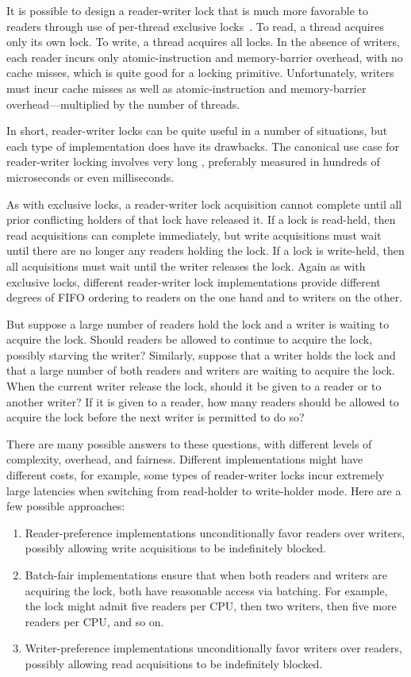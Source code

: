 It is possible to design a reader-writer lock that is much more
favorable to readers through use of per-thread exclusive
locks~\cite{WilsonCHsieh92a}.
To read, a thread acquires only its own lock.
To write, a thread acquires all locks.
In the absence of writers, each reader incurs only atomic-instruction
and memory-barrier overhead, with no cache misses, which is quite
good for a locking primitive.
Unfortunately, writers must incur cache misses as well as atomic-instruction
and memory-barrier overhead---multiplied by the number of threads.

In short, reader-writer locks can be quite useful in a number of
situations, but each type of implementation does have its drawbacks.
The canonical use case for reader-writer locking involves very long
, preferably measured in hundreds of microseconds
or even milliseconds.

As with exclusive locks, a reader-writer lock acquisition cannot complete
until all prior conflicting holders of that lock have released it.
If a lock is read-held, then read acquisitions can complete immediately,
but write acquisitions must wait until there are no longer any readers
holding the lock.
If a lock is write-held, then all acquisitions must wait until the writer
releases the lock.
Again as with exclusive locks, different reader-writer lock implementations
provide different degrees of FIFO ordering to readers on the one hand
and to writers on the other.

But suppose a large number of readers hold the lock and a writer is waiting
to acquire the lock.
Should readers be allowed to continue to acquire the lock, possibly
starving the writer?
Similarly, suppose that a writer holds the lock and that a large number
of both readers and writers are waiting to acquire the lock.
When the current writer release the lock, should it be given to a reader
or to another writer?
If it is given to a reader, how many readers should be allowed to acquire
the lock before the next writer is permitted to do so?

There are many possible answers to these questions, with different
levels of complexity, overhead, and fairness.
Different implementations might have different costs, for example,
some types of reader-writer locks incur extremely large latencies
when switching from read-holder to write-holder mode.
Here are a few possible approaches:

\begin{enumerate}
\item	
	Reader-preference implementations unconditionally favor readers
	over writers, possibly allowing write acquisitions to be
	indefinitely blocked.
\item	Batch-fair implementations ensure that when both readers and writers
	are acquiring the lock, both have reasonable access via batching.
	For example, the lock might admit five readers per CPU, then two
	writers, then five more readers per CPU, and so on.
\item	Writer-preference implementations unconditionally favor
	writers over readers, possibly allowing read acquisitions to be
	indefinitely blocked.
\end{enumerate}

